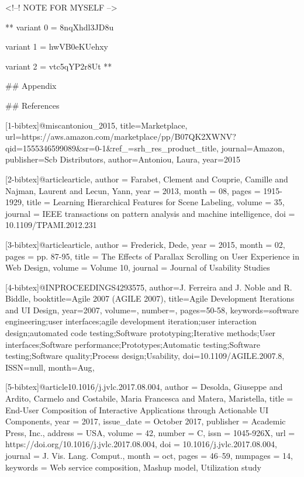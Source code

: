 <!--!  NOTE FOR MYSELF -->

**
variant 0 = 8nqXhdl3JD8u

variant 1 = hwVB0eKUehxy

variant 2 = vtc5qYP2r8Ut
**

## Appendix

## References


[1-bibtex]@misc{antoniou_2015, title={Marketplace}, url={https://aws.amazon.com/marketplace/pp/B07QK2XWNV?qid=1555346599089&sr=0-1&ref_=srh_res_product_title}, journal={Amazon}, publisher={Scb Distributors}, author={Antoniou, Laura}, year={2015}}


[2-bibtex]@article{article,
author = {Farabet, Clement and Couprie, Camille and Najman, Laurent and Lecun, Yann},
year = {2013},
month = {08},
pages = {1915-1929},
title = {Learning Hierarchical Features for Scene Labeling},
volume = {35},
journal = {IEEE transactions on pattern analysis and machine intelligence},
doi = {10.1109/TPAMI.2012.231}
}


[3-bibtex]@article{article,
author = {Frederick, Dede},
year = {2015},
month = {02},
pages = {pp. 87-95},
title = {The Effects of Parallax Scrolling on User Experience in Web Design},
volume = {Volume 10},
journal = {Journal of Usability Studies}
}

[4-bibtex]@INPROCEEDINGS{4293575,
author={J. {Ferreira} and J. {Noble} and R. {Biddle}},
booktitle={Agile 2007 (AGILE 2007)},
title={Agile Development Iterations and UI Design},
year={2007},
volume={},
number={},
pages={50-58},
keywords={software engineering;user interfaces;agile development iteration;user interaction design;automated code testing;Software prototyping;Iterative methods;User interfaces;Software performance;Prototypes;Automatic testing;Software testing;Software quality;Process design;Usability},
doi={10.1109/AGILE.2007.8},
ISSN={null},
month={Aug},}

[5-bibtex]@article{10.1016/j.jvlc.2017.08.004,
author = {Desolda, Giuseppe and Ardito, Carmelo and Costabile, Maria Francesca and Matera, Maristella},
title = {End-User Composition of Interactive Applications through Actionable UI Components},
year = {2017},
issue_date = {October 2017},
publisher = {Academic Press, Inc.},
address = {USA},
volume = {42},
number = {C},
issn = {1045-926X},
url = {https://doi.org/10.1016/j.jvlc.2017.08.004},
doi = {10.1016/j.jvlc.2017.08.004},
journal = {J. Vis. Lang. Comput.},
month = oct,
pages = {46–59},
numpages = {14},
keywords = {Web service composition, Mashup model, Utilization study}
}
  


